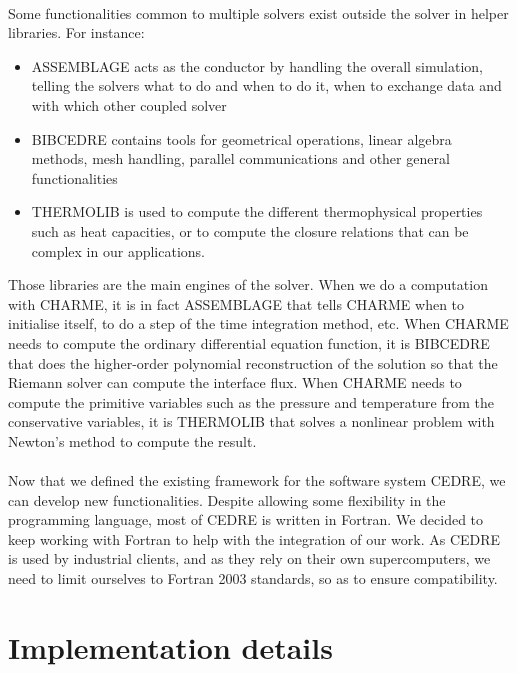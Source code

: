     \paragraph{}
    Some functionalities common to multiple solvers exist outside the solver in helper libraries.
    For instance:
    \begin{itemize}
      \item ASSEMBLAGE acts as the conductor by handling the overall simulation, telling the solvers what to do and when to do it, when to exchange data and with which other coupled solver
      \item BIBCEDRE contains tools for geometrical operations, linear algebra methods, mesh handling, parallel communications and other general functionalities
      \item THERMOLIB is used to compute the different thermophysical properties such as heat capacities, or to compute the closure relations that can be complex in our applications.
    \end{itemize}
    Those libraries are the main engines of the solver.
    When we do a computation with CHARME, it is in fact ASSEMBLAGE that tells CHARME when to initialise itself, to do a step of the time integration method, etc.
    When CHARME needs to compute the ordinary differential equation function, it is BIBCEDRE that does the higher-order polynomial reconstruction of the solution so that the Riemann solver can compute the interface flux.
    When CHARME needs to compute the primitive variables such as the pressure and temperature from the conservative variables, it is THERMOLIB that solves a nonlinear problem with Newton's method to compute the result.

    \paragraph{}
    Now that we defined the existing framework for the software system CEDRE, we can develop new functionalities.
    Despite allowing some flexibility in the programming language, most of CEDRE is written in Fortran.
    We decided to keep working with Fortran to help with the integration of our work.
    As CEDRE is used by industrial clients, and as they rely on their own supercomputers, we need to limit ourselves to Fortran 2003 standards, so as to ensure compatibility.


  \section{Implementation details}


